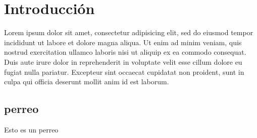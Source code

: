 \chapter*{Introducción}
\thispagestyle{empty} %
 

Lorem ipsum dolor sit amet, consectetur adipisicing elit, sed do eiusmod
tempor incididunt ut labore et dolore magna aliqua. Ut enim ad minim veniam,
quis nostrud exercitation ullamco laboris nisi ut aliquip ex ea commodo
consequat. Duis aute irure dolor in reprehenderit in voluptate velit esse
cillum dolore eu fugiat nulla pariatur. Excepteur sint occaecat cupidatat non
proident, sunt in culpa qui officia deserunt mollit anim id est laborum.


\section*{perreo}

Esto es un perreo


